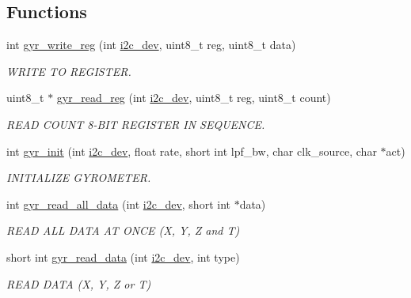 \subsection*{Functions}
\begin{DoxyCompactItemize}
\item 
int \hyperlink{group__gyr_ga3eba167b8ab0614bfe7bafeae8b5570d}{gyr\-\_\-write\-\_\-reg} (int \hyperlink{CommunicationV0_2communication_8c_a7751bd45ac1064efb35adf1f19c25db8}{i2c\-\_\-dev}, uint8\-\_\-t reg, uint8\-\_\-t data)
\begin{DoxyCompactList}\small\item\em W\-R\-I\-T\-E T\-O R\-E\-G\-I\-S\-T\-E\-R. \end{DoxyCompactList}\item 
uint8\-\_\-t $\ast$ \hyperlink{group__gyr_gad817a3b69d4c3026b7a9b6de32753e7b}{gyr\-\_\-read\-\_\-reg} (int \hyperlink{CommunicationV0_2communication_8c_a7751bd45ac1064efb35adf1f19c25db8}{i2c\-\_\-dev}, uint8\-\_\-t reg, uint8\-\_\-t count)
\begin{DoxyCompactList}\small\item\em R\-E\-A\-D C\-O\-U\-N\-T 8-\/\-B\-I\-T R\-E\-G\-I\-S\-T\-E\-R I\-N S\-E\-Q\-U\-E\-N\-C\-E. \end{DoxyCompactList}\item 
int \hyperlink{group__gyr_ga6d02be352b4491a236c9695a6a24d174}{gyr\-\_\-init} (int \hyperlink{CommunicationV0_2communication_8c_a7751bd45ac1064efb35adf1f19c25db8}{i2c\-\_\-dev}, float rate, short int lpf\-\_\-bw, char clk\-\_\-source, char $\ast$act)
\begin{DoxyCompactList}\small\item\em I\-N\-I\-T\-I\-A\-L\-I\-Z\-E G\-Y\-R\-O\-M\-E\-T\-E\-R. \end{DoxyCompactList}\item 
int \hyperlink{group__gyr_ga79875465c3a29fd9ec77308c80a8bc37}{gyr\-\_\-read\-\_\-all\-\_\-data} (int \hyperlink{CommunicationV0_2communication_8c_a7751bd45ac1064efb35adf1f19c25db8}{i2c\-\_\-dev}, short int $\ast$data)
\begin{DoxyCompactList}\small\item\em R\-E\-A\-D A\-L\-L D\-A\-T\-A A\-T O\-N\-C\-E (X, Y, Z and T) \end{DoxyCompactList}\item 
short int \hyperlink{group__gyr_ga271b37e9ace81b18bb2f83787247d262}{gyr\-\_\-read\-\_\-data} (int \hyperlink{CommunicationV0_2communication_8c_a7751bd45ac1064efb35adf1f19c25db8}{i2c\-\_\-dev}, int type)
\begin{DoxyCompactList}\small\item\em R\-E\-A\-D D\-A\-T\-A (X, Y, Z or T) \end{DoxyCompactList}\end{DoxyCompactItemize}


